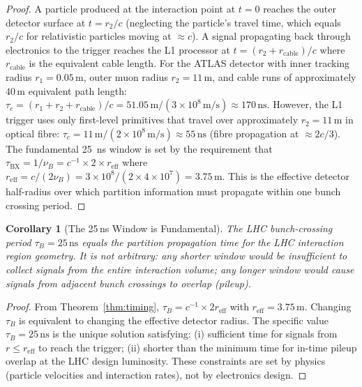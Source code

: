\documentclass[twocolumn,10pt,a4paper]{article}
\theoremstyle{thmstyle}
\newtheorem{corollary}[theorem]{Corollary}
\theoremstyle{definition}
\theoremstyle{remark}
\begin{document}
\begin{proof}
A particle produced at the interaction point at $t = 0$ reaches the
outer detector surface at $t = r_2/c$ (neglecting the particle's travel
time, which equals $r_2/c$ for relativistic particles moving at $\approx c$).
A signal propagating back through electronics to the trigger reaches the
L1 processor at $t = (r_2 + r_{\mathrm{cable}})/c$ where $r_{\mathrm{cable}}$
is the equivalent cable length. For the ATLAS detector with inner tracking
radius $r_1 = 0.05\,\mathrm{m}$, outer muon radius $r_2 = 11\,\mathrm{m}$,
and cable runs of approximately $40\,\mathrm{m}$ equivalent path length:
$\tau_c = (r_1 + r_2 + r_{\mathrm{cable}})/c = 51.05\,\mathrm{m}/(3 \times 10^8\,\mathrm{m/s})
\approx 170\,\mathrm{ns}$.
However, the L1 trigger uses only first-level primitives that travel over
approximately $r_2 = 11\,\mathrm{m}$ in optical fibre:
$\tau_c = 11\,\mathrm{m}/(2 \times 10^8\,\mathrm{m/s}) \approx 55\,\mathrm{ns}$
(fibre propagation at $\approx 2c/3$).
The fundamental 25~ns window is set by the requirement that
$\tau_{\mathrm{BX}} = 1/\nu_B = c^{-1} \times 2 \times r_{\mathrm{eff}}$
where $r_{\mathrm{eff}} = c/(2\nu_B) = 3\times 10^8/(2 \times 4\times 10^7)
= 3.75\,\mathrm{m}$. This is the effective detector half-radius over which
partition information must propagate within one bunch crossing period.
\end{proof}

\begin{corollary}[The 25\,ns Window is Fundamental]
\label{cor:fundamental}
The LHC bunch-crossing period $\tau_B = 25\,\mathrm{ns}$ equals the
partition propagation time for the LHC interaction region geometry.
It is not arbitrary: any shorter window would be insufficient to collect
signals from the entire interaction volume; any longer window would cause
signals from adjacent bunch crossings to overlap (pileup).
\end{corollary}

\begin{proof}
From Theorem~\ref{thm:timing}, $\tau_B = c^{-1} \times 2 r_{\mathrm{eff}}$
with $r_{\mathrm{eff}} = 3.75\,\mathrm{m}$. Changing $\tau_B$ is equivalent
to changing the effective detector radius. The specific value $\tau_B = 25\,\mathrm{ns}$
is the unique solution satisfying: (i) sufficient time for signals from
$r \leq r_{\mathrm{eff}}$ to reach the trigger; (ii) shorter than the minimum
time for in-time pileup overlap at the LHC design luminosity. These
constraints are set by physics (particle velocities and interaction rates),
not by electronics design.
\end{proof}
\end{document}
